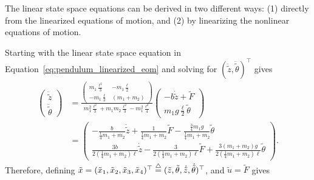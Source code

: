 The linear state space equations can be derived in two different ways: (1) directly from the linearized equations of motion, and (2) by linearizing the nonlinear equations of motion.

Starting with the linear state space equation in Equation~\eqref{eq:pendulum_linearized_eom} and solving for $(\ddot{\tilde{z}}, \ddot{\tilde{\theta}})^\top$ gives
\begin{align*}
\begin{pmatrix} \ddot{\tilde{z}} \\ \ddot{\tilde{\theta}} \end{pmatrix} &= \frac{\begin{pmatrix} m_1\frac{\ell^2}{3} & -m_1\frac{\ell}2 \\ -m_1\frac{\ell}{2} & (m_1+m_2)\end{pmatrix}}{m_1^2\frac{\ell^2}{3}+m_1m_2\frac{\ell^2}{3}-m_1^2\frac{\ell^2}{4}}\begin{pmatrix} -b\dot{\tilde{z}}+\tilde{F} \\ m_1g\frac{\ell}{2}\tilde{\theta} \end{pmatrix} \\
&= \begin{pmatrix} -\frac{b}{\frac{1}{4}m_1 + m_2}\dot{\tilde{z}} + \frac{1}{\frac{1}{4}m_1 + m_2}\tilde{F} - \frac{\frac{3}{4} m_1g}{\frac{1}{4}m_1 + m_2}\tilde{\theta} \\ \frac{3b}{2(\frac{1}{4}m_1 + m_2)\ell}\dot{\tilde{z}} - \frac{3}{2( \frac{1}{4}m_1 + m_2)\ell}\tilde{F} + \frac{3 (m_1+m_2)g}{2 (\frac{1}{4}m_1 + m_2)\ell}\tilde{\theta} \end{pmatrix}.
\end{align*}
Therefore, defining $\tilde{x}=(\tilde{x}_1, \tilde{x}_2, \tilde{x}_3, \tilde{x}_4)^\top\stackrel{\triangle}{=}(\tilde{z},\tilde{\theta},\dot{\tilde{z}},\dot{\tilde{\theta}})^\top$, and $\tilde{u}=\tilde{F}$ gives
